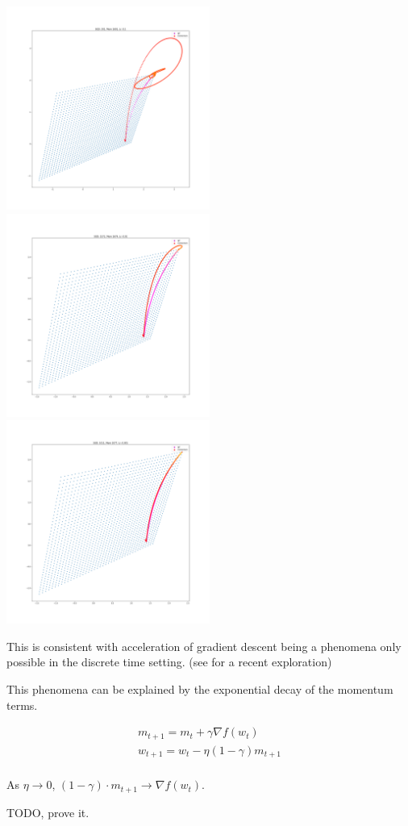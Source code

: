 \includegraphics[width=0.5\textwidth,height=0.5\textheight]{../../pictures/figures/vi_sgd-vs-vi_mom_01.png}
\includegraphics[width=0.5\textwidth,height=0.5\textheight]{../../pictures/figures/vi_sgd-vs-vi_mom_001.png}
\includegraphics[width=0.5\textwidth,height=0.5\textheight]{../../pictures/figures/vi_sgd-vs-vi_mom_0001.png}

This is consistent with acceleration of gradient descent being a phenomena only possible in the discrete time setting. (see \cite{Betancourt2018} for a recent exploration)

This phenomena can be explained by the exponential decay of the momentum terms.

\begin{align}
m_{t+1} = m_t + \gamma\nabla f(w_t) \\
w_{t+1} = w_t - \eta (1-\gamma) m_{t+1} \\
\end{align}

As \(\eta \to 0\), \((1-\gamma) \cdot m_{t+1} \to \nabla f(w_t)\).

TODO, prove it.
